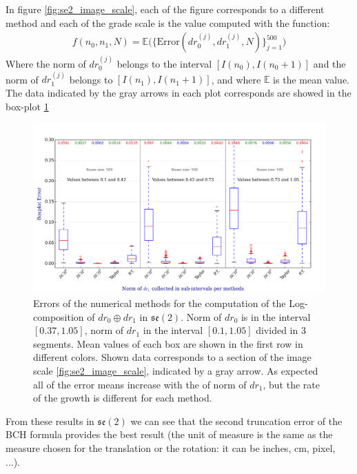 In figure \ref{fig:se2_image_scale}, each of the figure corresponds to a different method and each of the grade scale is the value computed with the function:
\begin{align*}
f(n_0,n_1,N) 
=
 \mathbb{E}\Big(
  \{ 
  \text{Error}(dr_{0}^{(j)},dr_{1}^{(j)},N) 
  \}_{j=1}^{500}
  \Big)
\end{align*}
Where the norm of $dr_{0}^{(j)}$ belongs to the interval $[I(n_0), I(n_0+1)]$ and the norm of 
$dr_{1}^{(j)}$ belongs to $[I(n_1), I(n_1+1)]$, and where $\mathbb{E}$ is the mean value.\\
The data indicated by the gray arrows in each plot corresponds are showed in the box-plot \ref{fig:se2_boxplot}
%
\begin{figure}[!ht]
	\hspace{-1.5cm}
	\includegraphics[scale=0.54]{figures/se2_boxplot.png}
	\caption{Errors of the numerical methods for the computation of the Log-composition of $dr_{0} \oplus dr_{1}$ in $\mathfrak{se}(2)$. Norm of $dr_{0}$ is in the interval $[0.37,1.05]$, norm of $dr_{1}$ in the interval $[0.1, 1.05]$ divided in 3 segments. Mean values of each box are shown in the first row in different colors. Shown data corresponds to a section of the image scale \ref{fig:se2_image_scale}, indicated by a gray arrow. As expected all of the error means increase with the of norm of $dr_1$, but the rate of the growth is different for each method.}
	\label{fig:se2_boxplot}
\end{figure}
%

From these results in $\mathfrak{se}(2)$ we can see that the second truncation error of the BCH formula provides the best result (the unit of measure is the same as the measure chosen for the translation or the rotation: it can be inches, cm, pixel, ...).

